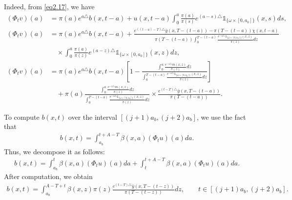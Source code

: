 \documentclass[10pt,a4paper]{amsart}
\makeatletter
\renewenvironment{proof}[1][\proofname]{\par
  \pushQED{\qed}%
  \normalfont \topsep6\p@\@plus6\p@\relax
  \trivlist
  \item[\hskip\labelsep
        \itshape
    #1\ \ref{#1}.]\ignorespaces
}{%
  \popQED\endtrivlist\@endpefalse
}
\makeatother
\begin{document}
\begin{proof}[of Proposition \ref{pr2.3}]
Indeed, from \eqref{eq2.17}, we have  
\begin{align*}
(\Phi_t v)(a) &= \pi(a)e^{a\triangle}b(x,t-a) + u(x,t-a) \int_{0}^{a} \frac{\pi(a)}{\pi(s)} e^{(a-s)\triangle} \mathds{1}_{\lbrace\omega\times[0,a_0]\rbrace}(x,s) ds, \\
(\Phi_t v)(a) &= \pi(a)e^{a\triangle}b(x,t-a) + \frac{e^{((t-a)-T)\triangle} \bar{y}(x,T-(t-a)) - \pi(T-(t-a)) \chi(x,t-a)}{\pi(T-(t-a)) \int_{0}^{T-(t-a)} \frac{e^{-z\triangle} \mathds{1}_{\lbrace\omega\times[0,a_0]\rbrace}(x,z)}{\pi(z)} dz} \\
&\quad \times \int_{0}^{a} \frac{\pi(a)}{\pi(z)} e^{(a-z)\triangle} \mathds{1}_{\lbrace\omega\times[0,a_0]\rbrace}(x,z) dz, \\
(\Phi_t v)(a) &= \pi(a)e^{a\triangle}b(x,t-a) \left[1 - \frac{\int_{0}^{a} \frac{e^{-z\triangle} m(x,z)}{\pi(z)} dz}{\int_{0}^{T-(t-a)} \frac{e^{-z\triangle} \mathds{1}_{\lbrace\omega\times[0,a_0]\rbrace}(x,z)}{\pi(z)} dz} \right] \\
&\quad + \pi(a) \frac{\int_{0}^{a} \frac{e^{-z\triangle} m(x,z)}{\pi(z)} dz}{\int_{0}^{T-(t-a)} \frac{e^{-z\triangle} \mathds{1}_{\lbrace\omega\times[0,a_0]\rbrace}(x,z)}{\pi(z)} dz} \times \frac{e^{(t-T)\triangle} \bar{y}(x,T-(t-a))}{\pi(T-(t-a))}.
\end{align*}  

To compute \( b(x,t) \) over the interval \([(j+1)a_b,(j+2)a_b]\), we use the fact that  
\begin{align*}
b(x,t) = \int_{a_b}^{t+A-T} \beta(x,a) (\Phi_t u)(a) da.
\end{align*}  
Thus, we decompose it as follows:  
\begin{align}
b(x,t) = \int_{a_b}^{t} \beta(x,a) (\Phi_t u)(a) da + \int_{t}^{t+A-T} \beta(x,a) (\Phi_t u)(a) da.
\end{align}  
After computation, we obtain  
\begin{align}
b(x,t) = \int_{a_b}^{A-T+t} \beta(x,z) \pi(z) \frac{e^{(t-T)\triangle} \bar{y}(x,T-(t-z))}{\pi(T-(t-z))} dz, \qquad t\in[(j+1)a_b,(j+2)a_b].
\end{align}  


\end{proof}
\end{document}
